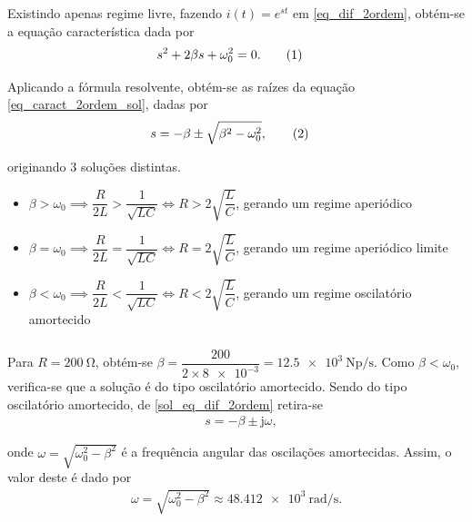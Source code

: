 \documentclass[a4paper, titlepage, portuguese]{article}
\newcommand{\eq}{\Leftrightarrow} %
\newcommand\numberthis{\addtocounter{equation}{1}\tag{\theequation}}
\newcommand\jj{\mathrm{j} }
\begin{document}
	\subsubsection{}

		\par
		Existindo apenas regime livre, fazendo $i(t) = e^{st}$ em \ref{eq_dif_2ordem}, obtém-se a equação característica dada por
		\begin{align*}
			&s^{2} + 2\beta s + \omega_{0}^{2} = 0 .\numberthis \label{eq_caract_2ordem_sol}
		\end{align*}

		Aplicando a fórmula resolvente, obtém-se as raízes da equação \ref{eq_caract_2ordem_sol}, dadas por
		\begin{align*}
			&s =   -\beta \pm \sqrt{ \beta^{2} - \omega_{0}^{2}}, \numberthis \label{sol_eq_caract_2ordem}
		\end{align*}

		originando 3 soluções distintas.

		\begin{itemize}
			\item $\beta > \omega_{0} \implies \dfrac{R}{2L} > \dfrac{1}{\sqrt{LC}} \eq R > 2
			\sqrt{\dfrac{L}{C}}$, gerando um regime aperiódico

			\item $\beta = \omega_{0} \implies \dfrac{R}{2L} = \dfrac{1}{\sqrt{LC}} \eq R = 2
			\sqrt{\dfrac{L}{C}}$, gerando um regime aperiódico limite

			\item $\beta < \omega_{0} \implies \dfrac{R}{2L} < \dfrac{1}{\sqrt{LC}} \eq R < 2
			\sqrt{\dfrac{L}{C}}$, gerando um regime oscilatório amortecido
		\end{itemize}

	\subsubsection{}

		\par
		Para $R = \SI{200}{\ohm} $, obtém-se $\beta = \dfrac{200}{2 \times \num{8e-3}} = \SI{12.5e3}{\neper\per\second}$. Como $\beta < \omega_{0}$, verifica-se que a solução é do tipo oscilatório amortecido. Sendo do tipo oscilatório amortecido, de \ref{sol_eq_dif_2ordem} retira-se
		\begin{align*}
			&s =   -\beta \pm \jj \omega,
		\end{align*}

		onde $\omega = \sqrt{\omega_{0}^{2} - \beta^{2}}$ é a frequência angular das oscilações amortecidas. Assim, o valor deste é dado por
		\begin{align*}
			\omega = \sqrt{\omega_{0}^{2} - \beta^{2}} \approx \SI{48.412e3}{\radian\per\second}.
		\end{align*}
\end{document}
